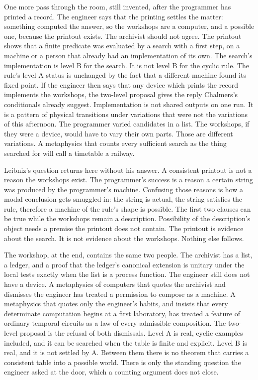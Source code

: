 \documentclass[11pt]{article}
\begin{document}
One more pass through the room, still invented, after the programmer has printed a record. The engineer says that the printing settles the matter: something computed the answer, so the workshops are a computer, and a possible one, because the printout exists. The archivist should not agree. The printout shows that a finite predicate was evaluated by a search with a first step, on a machine or a person that already had an implementation of its own. The search’s implementation is level B for the search. It is not level B for the cyclic rule. The rule’s level A status is unchanged by the fact that a different machine found its fixed point. If the engineer then says that any device which prints the record implements the workshops, the two-level proposal gives the reply Chalmers’s conditionals already suggest. Implementation is not shared outputs on one run. It is a pattern of physical transitions under variations that were not the variations of this afternoon. The programmer varied candidates in a list. The workshops, if they were a device, would have to vary their own parts. Those are different variations. A metaphysics that counts every sufficient search as the thing searched for will call a timetable a railway.

Leibniz’s question returns here without his answer. A consistent printout is not a reason the workshops exist. The programmer’s success is a reason a certain string was produced by the programmer’s machine. Confusing those reasons is how a modal conclusion gets smuggled in: the string is actual, the string satisfies the rule, therefore a machine of the rule’s shape is possible. The first two clauses can be true while the workshops remain a description. Possibility of the description’s object needs a premise the printout does not contain. The printout is evidence about the search. It is not evidence about the workshops. Nothing else follows.

The workshop, at the end, contains the same two people. The archivist has a list, a ledger, and a proof that the ledger’s canonical extension is unitary under the local tests exactly when the list is a process function. The engineer still does not have a device. A metaphysics of computers that quotes the archivist and dismisses the engineer has treated a permission to compose as a machine. A metaphysics that quotes only the engineer’s habits, and insists that every determinate computation begins at a first laboratory, has treated a feature of ordinary temporal circuits as a law of every admissible composition. The two-level proposal is the refusal of both dismissals. Level A is real, cyclic examples included, and it can be searched when the table is finite and explicit. Level B is real, and it is not settled by A. Between them there is no theorem that carries a consistent table into a possible world. There is only the standing question the engineer asked at the door, which a counting argument does not close.
\end{document}
